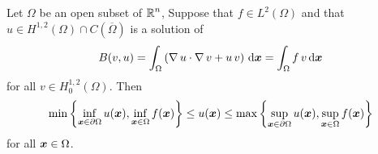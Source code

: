 \begin{prop} \label{ell_max_DP}
Let $\Omega$ be an open subset of $\displaystyle \mathbb{R}^n$,  Suppose that
$\displaystyle f\in L^2(\Omega)$ and that
$\displaystyle u\in H^{1,2}(\Omega)\cap C(\overline{\Omega})$ is a solution of
\begin{equation} \label{ell_max_eq1}
B(v,u) = \int_\Omega \left( \operatorname{\nabla} u \cdot \operatorname{\nabla} v + u\,v \right) \,\mathrm{d}{{\bm{x}}}
= \int_\Omega f\,v \,\mathrm{d}{{\bm{x}}}
\end{equation}
for all $\displaystyle v \in H^{1,2}_0(\Omega)$.  Then
\[
\min\left\{ \inf_{{\bm{x}}\in \partial \Omega} u({\bm{x}}),
\inf_{{\bm{x}}\in \Omega} f({\bm{x}}) \right\} \leq u({\bm{x}}) \leq
\max\left\{ \sup_{{\bm{x}}\in \partial \Omega} u({\bm{x}}),
\sup_{{\bm{x}}\in \Omega} f({\bm{x}}) \right\}
\]
for all ${\bm{x}} \in \Omega$.
\end{prop}

